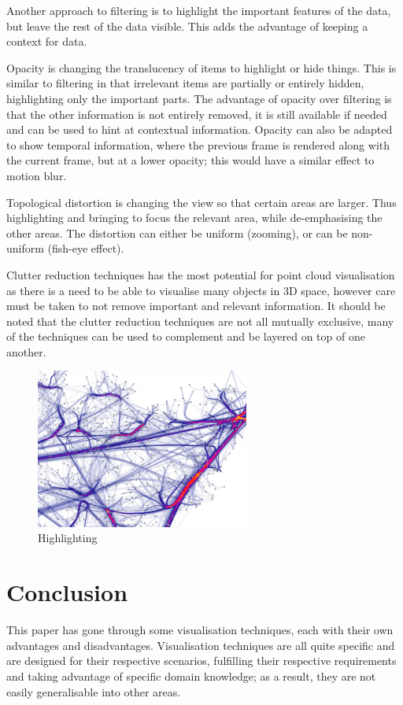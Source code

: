 \documentclass[a4paper]{article}
\begin{document}
Another approach to filtering is to highlight the important features of the
data, but leave the rest of the data visible. This adds the advantage of
keeping a context for data.

Opacity is changing the translucency of items to highlight or hide things. This
is similar to filtering in that irrelevant items are partially or entirely
hidden, highlighting only the important parts. The advantage of opacity over
filtering is that the other information is not entirely removed, it is still
available if needed and can be used to hint at contextual information. Opacity
can also be adapted to show temporal information, where the previous frame is
rendered along with the current frame, but at a lower opacity; this would have a
similar effect to motion blur.

Topological distortion is changing the view so that certain areas are larger.
Thus highlighting and bringing to focus the relevant area, while de-emphasising
the other areas. The distortion can either be uniform (zooming), or can be
non-uniform (fish-eye effect).

Clutter reduction techniques has the most potential for point cloud
visualisation as there is a need to be able to visualise many objects in 3D
space, however care must be taken to not remove important and relevant
information. It should be noted that the clutter reduction techniques are not
all mutually exclusive, many of the techniques can be used to complement and be
layered on top of one another.

\begin{figure}[h!]
  \begin{center}
    \includegraphics[width=70mm]{graph_highlight}
  \end{center}
  \caption{Highlighting}
  \label{fig:graphhighlight}
\end{figure}


\section{Conclusion}
This paper has gone through some visualisation techniques, each with their own
advantages and disadvantages. Visualisation techniques are all quite specific
and are designed for their respective scenarios, fulfilling their respective
requirements and taking advantage of specific domain knowledge; as a result,
they are not easily generalisable into other areas.
\end{document}
